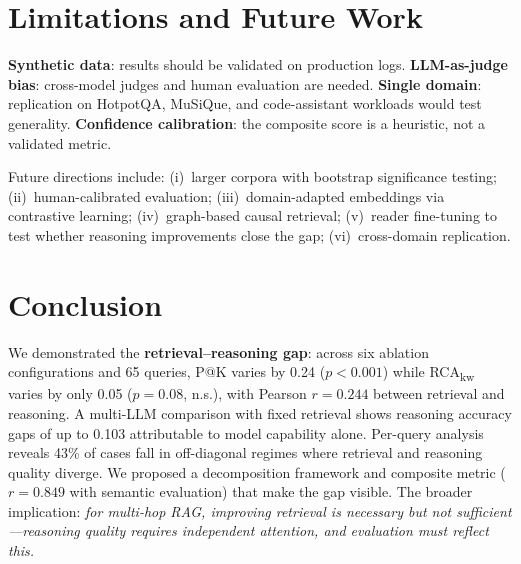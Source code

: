 \documentclass[11pt,a4paper]{article}
\begin{document}
\section{Limitations and Future Work}
\label{sec:limitations}

\textbf{Synthetic data}: results should be validated on production logs.
\textbf{LLM-as-judge bias}: cross-model judges and human evaluation
are needed.
\textbf{Single domain}: replication on HotpotQA, MuSiQue, and
code-assistant workloads would test generality.
\textbf{Confidence calibration}: the composite score is a heuristic,
not a validated metric.

Future directions include: (i)~larger corpora with bootstrap
significance testing; (ii)~human-calibrated evaluation;
(iii)~domain-adapted embeddings via contrastive learning;
(iv)~graph-based causal retrieval; (v)~reader fine-tuning to test
whether reasoning improvements close the gap; (vi)~cross-domain
replication.


\section{Conclusion}

We demonstrated the \textbf{retrieval--reasoning gap}: across six
ablation configurations and 65 queries, P@K varies by 0.24
($p{<}0.001$) while RCA\textsubscript{kw} varies by only 0.05
($p{=}0.08$, n.s.), with Pearson $r{=}0.244$ between retrieval and
reasoning.
A multi-LLM comparison with fixed retrieval shows reasoning accuracy
gaps of up to 0.103 attributable to model capability alone.
Per-query analysis reveals 43\% of cases fall in off-diagonal
regimes where retrieval and reasoning quality diverge.
We proposed a decomposition framework and composite metric
($r{=}0.849$ with semantic evaluation) that make the gap visible.
The broader implication: \emph{for multi-hop RAG, improving retrieval
is necessary but not sufficient---reasoning quality requires
independent attention, and evaluation must reflect this.}



\end{document}
